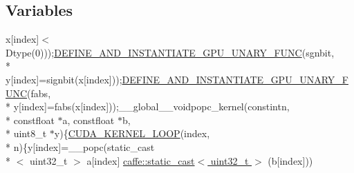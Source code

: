 \subsection*{Variables}
\begin{DoxyCompactItemize}
\item 
x\mbox{[}index\mbox{]}$<$ Dtype(0)));\hyperlink{math__functions_8hpp_ae57554839d87a430797d905d402e9d62}{D\+E\+F\+I\+N\+E\+\_\+\+A\+N\+D\+\_\+\+I\+N\+S\+T\+A\+N\+T\+I\+A\+T\+E\+\_\+\+G\+P\+U\+\_\+\+U\+N\+A\+R\+Y\+\_\+\+F\+U\+N\+C}(sgnbit, \\*
y\mbox{[}index\mbox{]}=signbit(x\mbox{[}index\mbox{]}));\hyperlink{math__functions_8hpp_ae57554839d87a430797d905d402e9d62}{D\+E\+F\+I\+N\+E\+\_\+\+A\+N\+D\+\_\+\+I\+N\+S\+T\+A\+N\+T\+I\+A\+T\+E\+\_\+\+G\+P\+U\+\_\+\+U\+N\+A\+R\+Y\+\_\+\+F\+U\+N\+C}(fabs, \\*
y\mbox{[}index\mbox{]}=fabs(x\mbox{[}index\mbox{]}));\+\_\+\+\_\+global\+\_\+\+\_\+voidpopc\+\_\+kernel(constintn, \\*
constfloat $\ast$a, constfloat $\ast$b, \\*
uint8\+\_\+t $\ast$y)\{\hyperlink{common_8hpp_aab638495f8b2376fdef4c318cee7b8c3}{C\+U\+D\+A\+\_\+\+K\+E\+R\+N\+E\+L\+\_\+\+L\+O\+O\+P}(index, \\*
n)\{y\mbox{[}index\mbox{]}=\+\_\+\+\_\+popc(static\+\_\+cast\\*
$<$ uint32\+\_\+t $>$ a\mbox{[}index\mbox{]} \hyperlink{namespacecaffe_a91eff1fdaaf60428c47eae6950deffb1}{caffe\+::static\+\_\+cast$<$ uint32\+\_\+t $>$} (b\mbox{[}index\mbox{]}))
\end{DoxyCompactItemize}
